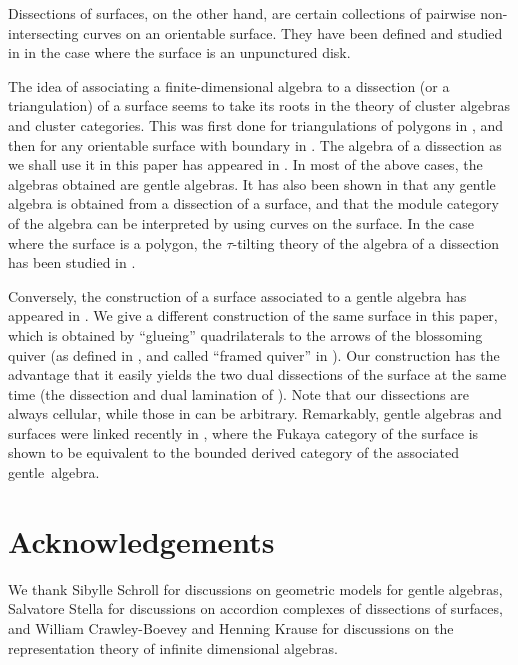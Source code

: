 \documentclass{amsart}
\theoremstyle{definition}
\begin{document}
Dissections of surfaces, on the other hand, are certain collections of pairwise non-intersecting curves on an orientable surface.
They have been defined and studied in \cite{Baryshnikov, Chapoton-quadrangulations, GarverMcConville, MannevillePilaud-accordion} in the case where the surface is an unpunctured disk.

The idea of associating a finite-dimensional algebra to a dissection (or a triangulation) of a surface seems to take its roots in the theory of cluster algebras and cluster categories.
This was first done for triangulations of polygons in \cite{CalderoChapotonSchiffler}, and then for any orientable surface with boundary in \cite{ABCP, Labardini}.  
The algebra of a dissection as we shall use it in this paper has appeared in \cite{DavidRoeslerSchiffler}.
In most of the above cases, the algebras obtained are gentle algebras.
It has also been shown in \cite{BaurCoelhoSimoes} that any gentle algebra is obtained from a dissection of a surface, and that the module category of the algebra can be interpreted by using curves on the surface.
In the case where the surface is a polygon, the $\tau$-tilting theory of the algebra of a dissection has been studied in \cite{PaluPilaudPlamondon, PilaudPlamondonStella}.

Conversely, the construction of a surface associated to a gentle algebra has appeared in \cite{OpperPlamondonSchroll}.
We give a different construction of the same surface in this paper, which is obtained by ``glueing'' quadrilaterals to the arrows of the blossoming quiver (as defined in \cite{PaluPilaudPlamondon}, and called ``framed quiver'' in \cite{BrustleDouvilleMousavandThomasYildirim}).
Our construction has the advantage that it easily yields the two dual dissections of the surface at the same time (the dissection and dual lamination of \cite{OpperPlamondonSchroll}).
Note that our dissections are always cellular, while those in \cite{BaurCoelhoSimoes} can be arbitrary.
Remarkably, gentle algebras and surfaces were linked recently in \cite{HaidenKatzarkovKontsevich, LekiliPolishchuk}, where the Fukaya category of the surface is shown to be equivalent to the bounded derived category of the associated gentle~algebra.

\section*{Acknowledgements}
We thank Sibylle Schroll for discussions on geometric models for gentle algebras, Salvatore Stella for discussions on accordion complexes of dissections of surfaces, and William Crawley-Boevey and Henning Krause for discussions on the representation theory of infinite dimensional algebras. 
\end{document}
